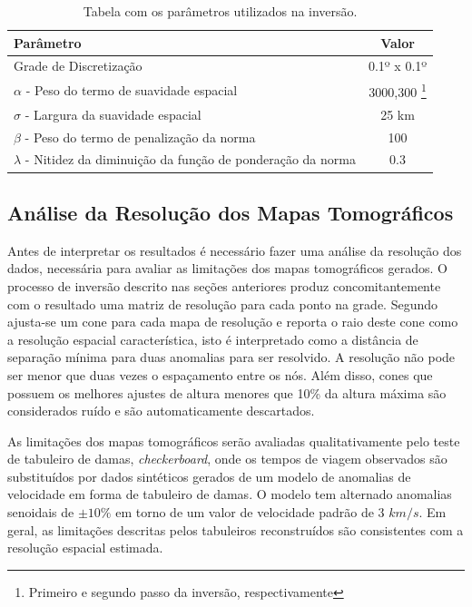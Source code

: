 \begin{savenotes}
\begin{table}[!ht]
\begin{center}
\small
\caption{Tabela com os parâmetros utilizados na inversão.}
\begin{tabular}{ l c }
\hline
{\textbf{Parâmetro}} & {\textbf{Valor}}\\
\hline
Grade de Discretização & 0.1º x 0.1º\\
$\alpha$ - Peso do termo de suavidade espacial & 3000,300 \footnote{Primeiro e segundo passo da inversão, respectivamente}
\\
$\sigma$ - Largura da suavidade espacial & 25 km\\
$\beta$ - Peso do termo de penalização da norma & 100\\
$\lambda$ - Nitidez da diminuição da função de ponderação da norma & 0.3\\
\hline
\end{tabular}
\label{tabelaPARAMETROS}
\end{center}
\end{table}
\end{savenotes}

\subsection{Análise da Resolução dos Mapas Tomográficos}

Antes de interpretar os resultados é necessário fazer uma análise da resolução dos dados, necessária para avaliar as limitações dos mapas tomográficos gerados. O processo de inversão descrito nas seções anteriores produz concomitantemente com o resultado uma matriz de resolução para cada ponto na grade. Segundo \cite{barmin_fast_2001} ajusta-se um cone para cada mapa de resolução e reporta o raio deste cone como a resolução espacial característica, isto é interpretado como a distância de separação mínima para duas anomalias para ser resolvido. A resolução não pode ser menor que duas vezes o espaçamento entre os nós. Além disso, cones que possuem os melhores ajustes de altura menores que 10\% da altura máxima são considerados ruído e são automaticamente descartados.  

As limitações dos mapas tomográficos serão avaliadas qualitativamente pelo teste de tabuleiro de damas, \textit{checkerboard}, onde os tempos de viagem observados são substituídos por dados sintéticos gerados de um modelo de anomalias  de velocidade em forma de tabuleiro de damas. O modelo tem alternado anomalias senoidais de $\pm 10\%$ em torno de um valor de velocidade padrão de 3 $km/s$. Em geral, as limitações descritas pelos tabuleiros reconstruídos são consistentes com a resolução espacial estimada.

